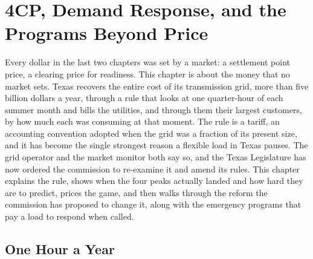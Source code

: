 \chapter{4CP, Demand Response, and the Programs Beyond Price}
\label{ch:fourcp}

Every dollar in the last two chapters was set by a market: a settlement point price, a clearing price for readiness. This chapter is about the money that no market sets. Texas recovers the entire cost of its transmission grid, more than five billion dollars a year, through a rule that looks at one quarter-hour of each summer month and bills the utilities, and through them their largest customers, by how much each was consuming at that moment. %
The rule is a tariff, an accounting convention adopted when the grid was a fraction of its present size, and it has become the single strongest reason a flexible load in Texas pauses. The grid operator and the market monitor both say so, and the Texas Legislature has now ordered the commission to re-examine it and amend its rules. %
This chapter explains the rule, shows when the four peaks actually landed and how hard they are to predict, prices the game, and then walks through the reform the commission has proposed to change it, along with the emergency programs that pay a load to respond when called.

\section{One Hour a Year}
\label{sec:fourcp-rule}

